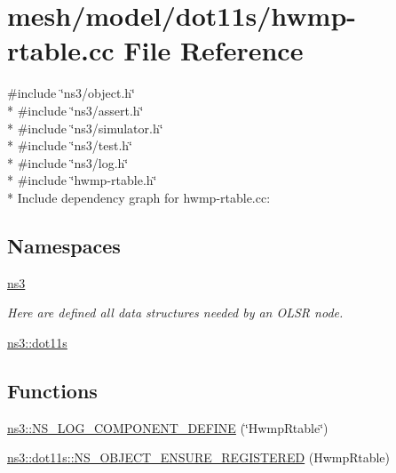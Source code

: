 \hypertarget{hwmp-rtable_8cc}{}\section{mesh/model/dot11s/hwmp-\/rtable.cc File Reference}
\label{hwmp-rtable_8cc}
{\ttfamily \#include \char`\"{}ns3/object.\+h\char`\"{}}\\*
{\ttfamily \#include \char`\"{}ns3/assert.\+h\char`\"{}}\\*
{\ttfamily \#include \char`\"{}ns3/simulator.\+h\char`\"{}}\\*
{\ttfamily \#include \char`\"{}ns3/test.\+h\char`\"{}}\\*
{\ttfamily \#include \char`\"{}ns3/log.\+h\char`\"{}}\\*
{\ttfamily \#include \char`\"{}hwmp-\/rtable.\+h\char`\"{}}\\*
Include dependency graph for hwmp-\/rtable.cc\+:
\subsection*{Namespaces}
\begin{DoxyCompactItemize}
\item 
 \hyperlink{namespacens3}{ns3}
\begin{DoxyCompactList}\small\item\em Here are defined all data structures needed by an O\+L\+SR node. \end{DoxyCompactList}\item 
 \hyperlink{namespacens3_1_1dot11s}{ns3\+::dot11s}
\end{DoxyCompactItemize}
\subsection*{Functions}
\begin{DoxyCompactItemize}
\item 
\hyperlink{namespacens3_a5901e3da05b24ba2d2d532d07c54822b}{ns3\+::\+N\+S\+\_\+\+L\+O\+G\+\_\+\+C\+O\+M\+P\+O\+N\+E\+N\+T\+\_\+\+D\+E\+F\+I\+NE} (\char`\"{}Hwmp\+Rtable\char`\"{})
\item 
\hyperlink{namespacens3_1_1dot11s_af2da1896278bc0b59ad91994b79229a6}{ns3\+::dot11s\+::\+N\+S\+\_\+\+O\+B\+J\+E\+C\+T\+\_\+\+E\+N\+S\+U\+R\+E\+\_\+\+R\+E\+G\+I\+S\+T\+E\+R\+ED} (Hwmp\+Rtable)
\end{DoxyCompactItemize}

